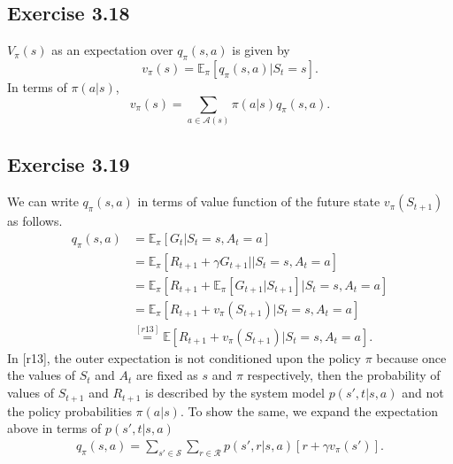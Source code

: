 \documentclass[10pt]{article}
\begin{document}
	\subsection*{Exercise 3.18}
	\label{ss:3.18}
	$V_{\pi}(s)$ as an expectation over $q_{\pi}(s,a)$ is given by
	\begin{equation*}
	v_{\pi}(s) = \mathbb{E}_{\pi} \left[ q_\pi(s,a) | S_{t} = s \right].
	\end{equation*}
	In terms of $\pi(a|s)$, 
	\begin{equation*}
	v_\pi(s) = \sum_{a\in\mathcal{A}(s)} \pi(a|s)q_{\pi}(s,a).
	\end{equation*}
	\subsection*{Exercise 3.19}
	\label{ss:3.19}
	We can write $q_\pi(s,a)$ in terms of value function of the future state $v_\pi(S_{t+1})$ as follows.
	\begin{align*}
	q_\pi(s,a) &= \mathbb{E}_\pi \left[ G_t | S_t = s, A_t = a \right]\\
	&= \mathbb{E}_\pi \left[ R_{t+1} + \gamma G_{t+1} | |S_t = s, A_t = a \right]\\
	&= \mathbb{E}_\pi\left[ R_{t+1} + \mathbb{E}_{\pi} \left[ G_{t+1} | S_{t+1} \right] | S_t = s, A_t = a \right]\\
	&= \mathbb{E}_\pi\left[ R_{t+1} + v_{\pi}(S_{t+1}) | S_t = s, A_t = a \right]\\
	&\stackrel{[r13]}{=} \mathbb{E}\left[ R_{t+1} + v_{\pi}(S_{t+1}) | S_t = s, A_t = a \right].
	\end{align*}
	In [r13], the outer expectation is not conditioned upon the policy $\pi$ because once the values of $S_{t}$ and $A_t$ are fixed as $s$ and $\pi$ respectively, then the probability of values of $S_{t+1}$ and $R_{t+1}$ is described by the system model $p(s',t|s,a)$ and not the policy probabilities $\pi(a|s)$. To show the same, we expand the expectation above in terms of $p(s',t|s,a)$
	\begin{align*}
	q_{\pi}(s,a) = \sum_{s'\in\mathcal{S}} \sum_{r\in\mathcal{R}} p(s',r|s,a) \left[ r + \gamma v_{\pi}(s') \right].
	\end{align*}
\end{document}
